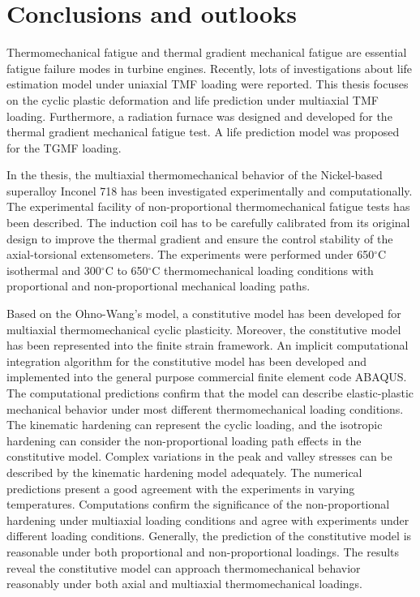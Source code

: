 \chapter{Conclusions and outlooks}
\noindent
Thermomechanical fatigue and thermal gradient mechanical fatigue are essential fatigue failure modes in turbine engines.
Recently, lots of investigations about life estimation model under uniaxial TMF loading were reported. This thesis focuses on the cyclic plastic deformation and life prediction under multiaxial TMF loading. Furthermore, a radiation furnace was designed and developed for the thermal gradient mechanical fatigue test. A life prediction model was proposed for the TGMF loading.

In the thesis, the multiaxial thermomechanical behavior of the Nickel-based superalloy Inconel 718 has been investigated experimentally and computationally.
The experimental facility of non-proportional thermomechanical fatigue tests has been described. The induction coil has to be carefully calibrated from its original design to improve the thermal gradient and ensure the control stability of the axial-torsional extensometers. The experiments were performed under 650$^\circ$C isothermal and 300$^\circ$C to 650$^\circ$C thermomechanical loading conditions with proportional and non-proportional mechanical loading paths. 

Based on the Ohno-Wang's model, a constitutive model has been developed for multiaxial thermomechanical cyclic plasticity.
Moreover, the constitutive model has been represented into the finite strain framework.
An implicit computational integration algorithm for the constitutive model has been developed and implemented into the general purpose commercial finite element code ABAQUS. The computational predictions confirm that the model can describe elastic-plastic mechanical behavior under most different thermomechanical loading conditions.
The kinematic hardening can represent the cyclic loading, and the isotropic hardening can consider the non-proportional loading path effects in the constitutive model.
Complex variations in the peak and valley stresses can be described by the kinematic hardening model adequately. The numerical predictions present a good agreement with the experiments in varying temperatures.
Computations confirm the significance of the non-proportional hardening under multiaxial loading conditions and agree with experiments under different loading conditions. Generally, the prediction of the constitutive model is reasonable under both proportional and non-proportional loadings.
The results reveal the constitutive model can approach thermomechanical behavior reasonably under both axial and multiaxial thermomechanical loadings.

